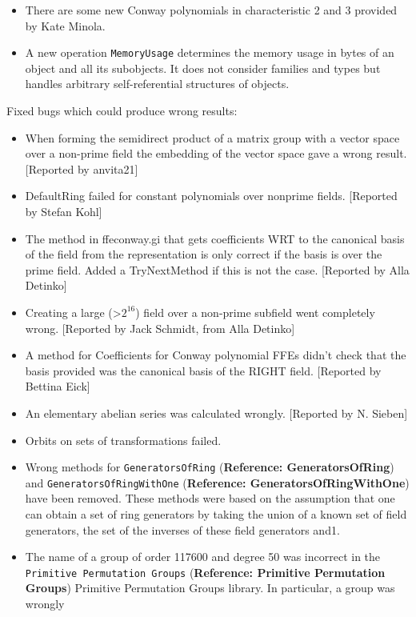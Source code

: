 \documentclass[a4paper,11pt]{report}
\begin{document}
{{\begin{itemize}
strings read by \textsf{GAP} and the lists returned by \texttt{List} (\textbf{Reference: Lists}) only occupy the memory they really need. For more details see the
documentation of the new function \texttt{EmptyPlist} (\textbf{Reference: EmptyPlist}). 
\item  There are some new Conway polynomials in characteristic 2 and 3 provided by
Kate Minola. 
\item  A new operation \texttt{MemoryUsage} determines the memory usage in bytes of an object and all its subobjects. It
does not consider families and types but handles arbitrary self-referential
structures of objects. 
\end{itemize}
 Fixed bugs which could produce wrong results: 
\begin{itemize}
\item  When forming the semidirect product of a matrix group with a vector space over
a non-prime field the embedding of the vector space gave a wrong result.
[Reported by anvita21] 
\item  DefaultRing failed for constant polynomials over nonprime fields. [Reported by
Stefan Kohl] 
\item  The method in ffeconway.gi that gets coefficients WRT to the canonical basis
of the field from the representation is only correct if the basis is over the
prime field. Added a TryNextMethod if this is not the case. [Reported by Alla
Detinko] 
\item  Creating a large ({\textgreater}$2^{16}$) field over a non-prime subfield went completely wrong. [Reported by Jack
Schmidt, from Alla Detinko] 
\item  A method for Coefficients for Conway polynomial FFEs didn't check that the
basis provided was the canonical basis of the RIGHT field. [Reported by
Bettina Eick] 
\item  An elementary abelian series was calculated wrongly. [Reported by N. Sieben] 
\item  Orbits on sets of transformations failed. 
\item  Wrong methods for \texttt{GeneratorsOfRing} (\textbf{Reference: GeneratorsOfRing}) and \texttt{GeneratorsOfRingWithOne} (\textbf{Reference: GeneratorsOfRingWithOne}) have been removed. These methods were based on the assumption that one can
obtain a set of ring generators by taking the union of a known set of field
generators, the set of the inverses of these field generators
and{\nobreakspace}\texttt{}1\texttt{}. 
\item  The name of a group of order 117600 and degree 50 was incorrect in the \texttt{Primitive Permutation Groups} (\textbf{Reference: Primitive Permutation Groups}) Primitive Permutation Groups library. In particular, a group was wrongly

\end{itemize}}}
\end{document}

